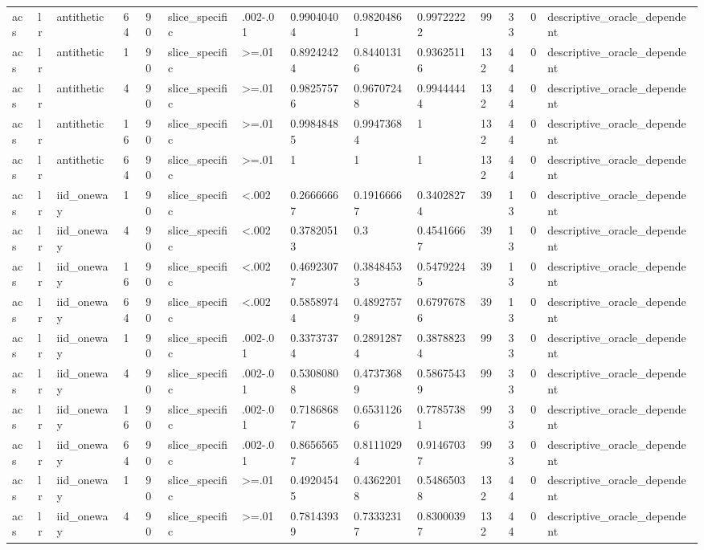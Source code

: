 \begin{tabular}{llllllllllllll}
acs & lr & antithetic & 64 & 90 & slice\_specific & .002-.01 & 0.99040404 & 0.98204861 & 0.99722222 & 99 & 33 & 0 & descriptive\_oracle\_dependent \\
acs & lr & antithetic & 1 & 90 & slice\_specific & >=.01 & 0.89242424 & 0.84401316 & 0.93625116 & 132 & 44 & 0 & descriptive\_oracle\_dependent \\
acs & lr & antithetic & 4 & 90 & slice\_specific & >=.01 & 0.98257576 & 0.96707248 & 0.99444444 & 132 & 44 & 0 & descriptive\_oracle\_dependent \\
acs & lr & antithetic & 16 & 90 & slice\_specific & >=.01 & 0.99848485 & 0.99473684 & 1 & 132 & 44 & 0 & descriptive\_oracle\_dependent \\
acs & lr & antithetic & 64 & 90 & slice\_specific & >=.01 & 1 & 1 & 1 & 132 & 44 & 0 & descriptive\_oracle\_dependent \\
acs & lr & iid\_oneway & 1 & 90 & slice\_specific & <.002 & 0.26666667 & 0.19166667 & 0.34028274 & 39 & 13 & 0 & descriptive\_oracle\_dependent \\
acs & lr & iid\_oneway & 4 & 90 & slice\_specific & <.002 & 0.37820513 & 0.3 & 0.45416667 & 39 & 13 & 0 & descriptive\_oracle\_dependent \\
acs & lr & iid\_oneway & 16 & 90 & slice\_specific & <.002 & 0.46923077 & 0.38484533 & 0.54792245 & 39 & 13 & 0 & descriptive\_oracle\_dependent \\
acs & lr & iid\_oneway & 64 & 90 & slice\_specific & <.002 & 0.58589744 & 0.48927579 & 0.67976786 & 39 & 13 & 0 & descriptive\_oracle\_dependent \\
acs & lr & iid\_oneway & 1 & 90 & slice\_specific & .002-.01 & 0.33737374 & 0.28912874 & 0.38788234 & 99 & 33 & 0 & descriptive\_oracle\_dependent \\
acs & lr & iid\_oneway & 4 & 90 & slice\_specific & .002-.01 & 0.53080808 & 0.47373689 & 0.58675439 & 99 & 33 & 0 & descriptive\_oracle\_dependent \\
acs & lr & iid\_oneway & 16 & 90 & slice\_specific & .002-.01 & 0.71868687 & 0.65311266 & 0.77857381 & 99 & 33 & 0 & descriptive\_oracle\_dependent \\
acs & lr & iid\_oneway & 64 & 90 & slice\_specific & .002-.01 & 0.86565657 & 0.81110294 & 0.91467037 & 99 & 33 & 0 & descriptive\_oracle\_dependent \\
acs & lr & iid\_oneway & 1 & 90 & slice\_specific & >=.01 & 0.49204545 & 0.43622018 & 0.54865038 & 132 & 44 & 0 & descriptive\_oracle\_dependent \\
acs & lr & iid\_oneway & 4 & 90 & slice\_specific & >=.01 & 0.78143939 & 0.73332317 & 0.83000397 & 132 & 44 & 0 & descriptive\_oracle\_dependent \\

\end{tabular}
